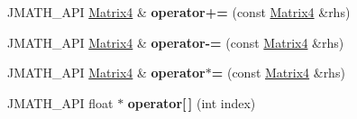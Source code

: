 \begin{DoxyCompactItemize}
\item 
\hypertarget{class_matrix4_aa25858af1530f2c1101349e10cb5ab0d}{J\+M\+A\+T\+H\+\_\+\+A\+P\+I \hyperlink{class_matrix4}{Matrix4} \& {\bfseries operator+=} (const \hyperlink{class_matrix4}{Matrix4} \&rhs)}\label{class_matrix4_aa25858af1530f2c1101349e10cb5ab0d}

\item 
\hypertarget{class_matrix4_a6fe855f09d83716443ab52a59ad87558}{J\+M\+A\+T\+H\+\_\+\+A\+P\+I \hyperlink{class_matrix4}{Matrix4} \& {\bfseries operator-\/=} (const \hyperlink{class_matrix4}{Matrix4} \&rhs)}\label{class_matrix4_a6fe855f09d83716443ab52a59ad87558}

\item 
\hypertarget{class_matrix4_a86ddf7cab948e73a4a3ec05e7c62158c}{J\+M\+A\+T\+H\+\_\+\+A\+P\+I \hyperlink{class_matrix4}{Matrix4} \& {\bfseries operator$\ast$=} (const \hyperlink{class_matrix4}{Matrix4} \&rhs)}\label{class_matrix4_a86ddf7cab948e73a4a3ec05e7c62158c}

\item 
\hypertarget{class_matrix4_a317ea3856823b23f0868977a6312008c}{J\+M\+A\+T\+H\+\_\+\+A\+P\+I float $\ast$ {\bfseries operator\mbox{[}$\,$\mbox{]}} (int index)}\label{class_matrix4_a317ea3856823b23f0868977a6312008c}

\end{DoxyCompactItemize}
